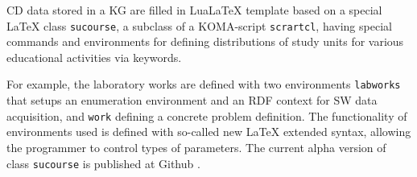\documentclass[
]{aiitart}
\providecommand{\LuaLaTeX}{Lua\LaTeX}
\begin{document}
CD data stored in a KG are filled in \LuaLaTeX{} template based on a special \LaTeX{} class \verb|sucourse|, a subclass of a KOMA-script \verb|scrartcl|, having special commands and environments for defining distributions of study units for various educational activities via keywords.  %

For example, the laboratory works are defined with two environments \verb|labworks| that setups an enumeration environment and an RDF context for SW data acquisition, and \verb|work| defining a concrete problem definition.  %
The functionality of environments used is defined with so-called new \LaTeX{} extended syntax, allowing the programmer to control types of parameters.  %
The current alpha version of class \verb|sucourse| is published at Github \cite{ghs}. %
\end{document}
